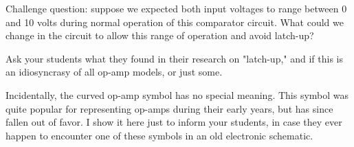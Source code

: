 \vskip 10pt

Challenge question: suppose we expected both input voltages to range between 0 and 10 volts during normal operation of this comparator circuit.  What could we change in the circuit to allow this range of operation and avoid latch-up?







Ask your students what they found in their research on "latch-up," and if this is an idiosyncrasy of all op-amp models, or just some.

Incidentally, the curved op-amp symbol has no special meaning.  This symbol was quite popular for representing op-amps during their early years, but has since fallen out of favor.  I show it here just to inform your students, in case they ever happen to encounter one of these symbols in an old electronic schematic.




